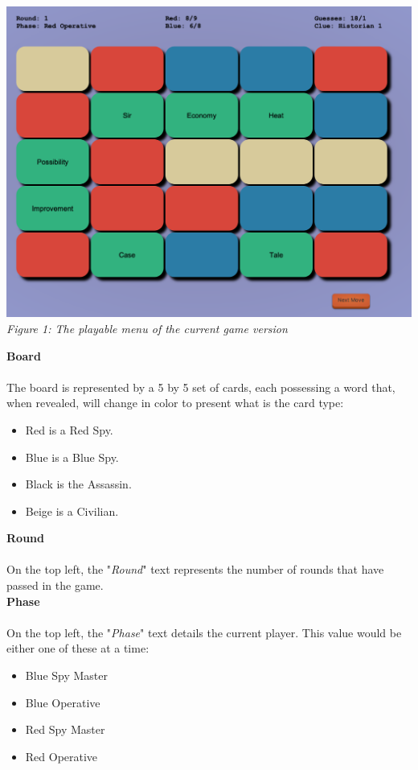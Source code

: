 \documentclass[10pt, a4paper]{article}
\begin{document}
		\begin{center}
			\includegraphics[scale=0.37]{Images/01_game_interface.png}
			\textit{\\Figure 1: The playable menu of the current game version}			
		\end{center}
	
		\textbf{Board}\\
		\\
		The board is represented by a 5 by 5 set of cards, each possessing a word that, when revealed, will change in color to present what is the card type:  
		    \begin{itemize}
		        \item Red is a Red Spy.
		        \item Blue is a Blue Spy.
		        \item Black is the Assassin.
		        \item Beige is a Civilian.
		    \end{itemize}
		    
	    \textbf{Round}\\
	    \\
	    On the top left, the "\textit{Round}" text represents the number of rounds that have passed in the game.\\
	    
	    \textbf{Phase}\\
	    \\
	    On the top left, the "\textit{Phase}" text details the current player. This value would be either one of these at a time:
	        \begin{itemize}
	            \item Blue Spy Master
	            \item Blue Operative
	            \item Red Spy Master
	            \item Red Operative
	        \end{itemize}
	   
\end{document}
